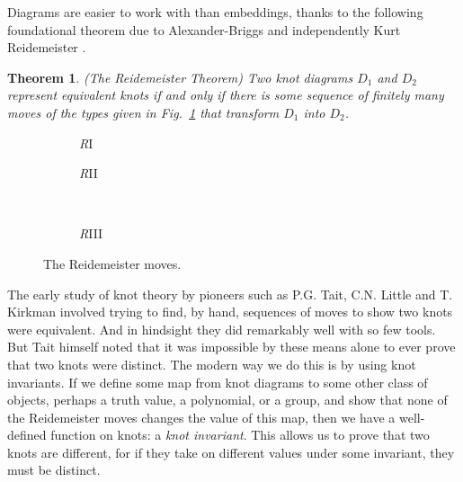 \documentclass[12pt]{report}
\newtheorem*{theorem}{Theorem}
\begin{document}
Diagrams are easier to work with than embeddings, thanks to the following foundational theorem due to Alexander-Briggs  \cite{types-of-knotted-curves} and independently Kurt Reidemeister \cite{elementary-justification-knot-theory}.
\begin{theorem}(The Reidemeister Theorem)
Two knot diagrams $D_{1}$ and $D_{2}$ represent equivalent knots if and only if there is some sequence of finitely many moves of the types given in Fig.~\ref{fig:reidemeister_moves} that transform $D_{1}$ into $D_{2}$.
\end{theorem}

\begin{figure}[hbt!]
	\centering
	\hspace*{\fill}
	\begin{subfigure}[b]{0.35 \textwidth}
		\centering
		\def\svgscale{0.22}
		
		\caption{\textit{R}I}
	\end{subfigure}
	\hspace*{\fill}
	\begin{subfigure}[b]{0.35 \textwidth}
		\centering
		\def\svgscale{0.22}
		
		\caption{\textit{R}II}
	\end{subfigure}
	\hspace*{\fill}
	\\
	\hspace*{\fill}
	\begin{subfigure}[b]{0.35 \textwidth}
		\centering
		\def\svgscale{0.22}
		
		\caption{\textit{R}III}
	\end{subfigure}
	\hspace*{\fill}
	\caption{The Reidemeister moves.}
	\label{fig:reidemeister_moves}
\end{figure}


The early study of knot theory by pioneers such as P.G. Tait, C.N. Little and T. Kirkman involved trying to find, by hand, sequences of moves to show two knots were equivalent. And in hindsight they did remarkably well with so few tools. But Tait himself noted that it was impossible by these means alone to ever prove that two knots were distinct. The modern way we do this is by using knot invariants. If we define some map from knot diagrams to some other class of objects, perhaps a truth value, a polynomial, or a group, and show that none of the Reidemeister moves changes the value of this map, then we have a well-defined function on knots: a \textit{knot invariant}. This allows us to prove that two knots are different, for if they take on different values under some invariant, they must be distinct.
\end{document}
